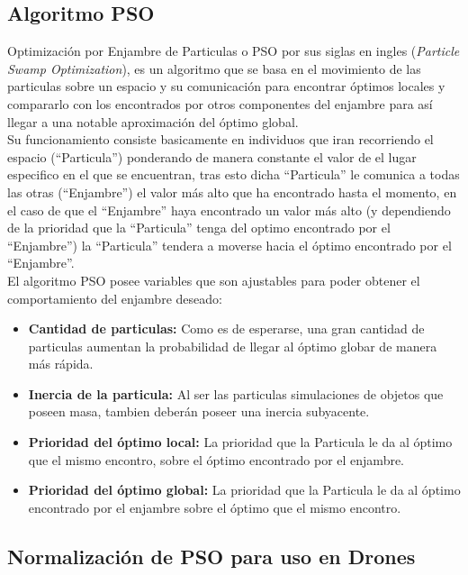 \documentclass[journal]{IEEEtran}
\begin{document}
\subsection{Algoritmo PSO}

Optimización por Enjambre de Particulas o PSO por sus siglas en ingles (\textit{Particle Swamp Optimization}), es un algoritmo que se basa en el movimiento de las particulas sobre un espacio y su comunicación para encontrar óptimos locales y compararlo con los encontrados por otros componentes del enjambre para así llegar a una notable aproximación del óptimo global.\\

Su funcionamiento consiste basicamente en individuos que iran recorriendo el espacio (``Particula'') ponderando de manera constante el valor de el lugar especifico en el que se encuentran, tras esto dicha ``Particula'' le comunica a todas las otras (``Enjambre'') el valor más alto que ha encontrado hasta el momento, en el caso de que el ``Enjambre'' haya encontrado un valor más alto (y dependiendo de la prioridad que la ``Particula'' tenga del optimo encontrado por el ``Enjambre'') la ``Particula'' tendera a moverse hacia el óptimo encontrado por el ``Enjambre''.\\

El algoritmo PSO posee variables que son ajustables para poder obtener el comportamiento del enjambre deseado:\\

\begin{itemize}
\item \textbf{Cantidad de particulas:} Como es de esperarse, una gran cantidad de particulas aumentan la probabilidad de llegar al óptimo globar de manera más rápida.
\item \textbf{Inercia de la particula:} Al ser las particulas simulaciones de objetos que poseen masa, tambien deberán poseer una inercia subyacente.
\item \textbf{Prioridad del óptimo local:} La prioridad que la Particula le da al óptimo que el mismo encontro, sobre el óptimo encontrado por el enjambre.
\item \textbf{Prioridad del óptimo global:} La prioridad que la Particula le da al óptimo encontrado por el enjambre sobre el óptimo que el mismo encontro.
\end{itemize}

\subsection{Normalización de PSO para uso en Drones}
\end{document}
